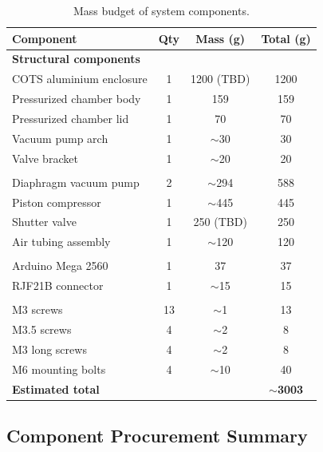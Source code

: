 \documentclass[
  a4paper,
  11pt,
  openany,
  parskip,
  toc=totoc,
  listof=totoc,
  bibliography=totoc
]{scrreprt}
\begin{document}
\begin{table}[htbp]
\centering
\begin{tabular}{lccc}
\toprule
\textbf{Component} & \textbf{Qty} & \textbf{Mass (g)} & \textbf{Total (g)} \\
\midrule

\multicolumn{4}{l}{\textbf{Structural components}} \\

COTS aluminium enclosure & 1 & 1200 (TBD) & 1200 \\
Pressurized chamber body & 1 & 159 & 159 \\
Pressurized chamber lid & 1 & 70 & 70 \\
Vacuum pump arch & 1 & $\sim$30 & 30 \\
Valve bracket & 1 & $\sim$20 & 20 \\

\addlinespace
\multicolumn{4}{l}{\textbf{Fluid system}} \\

Diaphragm vacuum pump & 2 & $\sim$294 & 588 \\
Piston compressor & 1 & $\sim$445 & 445 \\
Shutter valve & 1 & 250 (TBD) & 250 \\
Air tubing assembly & 1 & $\sim$120 & 120 \\

\addlinespace
\multicolumn{4}{l}{\textbf{Electronics}} \\

Arduino Mega 2560 & 1 & 37 & 37 \\
RJF21B connector & 1 & $\sim$15 & 15 \\

\addlinespace
\multicolumn{4}{l}{\textbf{Fasteners}} \\

M3 screws & 13 & $\sim$1 & 13 \\
M3.5 screws & 4 & $\sim$2 & 8 \\
M3 long screws & 4 & $\sim$2 & 8 \\
M6 mounting bolts & 4 & $\sim$10 & 40 \\

\midrule
\textbf{Estimated total} & & & \textbf{$\sim$3003} \\
\bottomrule
\end{tabular}
\caption{Mass budget of system components.}
\label{tab:mass_budget}
\end{table}

\subsection{Component Procurement Summary}
\end{document}
